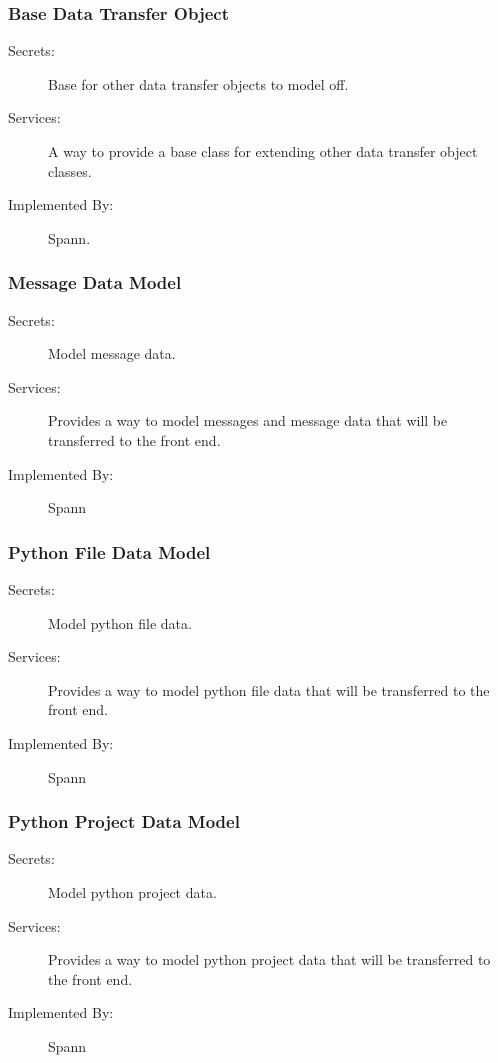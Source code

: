 \documentclass[12pt, titlepage]{article}
\begin{document}
\subsubsection{Base Data Transfer Object}

\begin{description}
\item[Secrets:] Base for other data transfer objects to model off.
\item[Services:] A way to provide a base class for extending other data
    transfer object classes.
\item[Implemented By:] Spann.
\end{description}

\subsubsection{Message Data Model}

\begin{description}
\item[Secrets:] Model message data.
\item[Services:] Provides a way to model messages and message data that will be
    transferred to the front end.
\item[Implemented By:] Spann
\end{description}

\subsubsection{Python File Data Model}

\begin{description}
\item[Secrets:] Model python file data.
\item[Services:] Provides a way to model python file data that will be transferred to the front end.
\item[Implemented By:] Spann
\end{description}

\subsubsection{Python Project Data Model}

\begin{description}
\item[Secrets:] Model python project data.
\item[Services:] Provides a way to model python project data that will be transferred to the front end.
\item[Implemented By:] Spann
\end{description}
\end{document}
